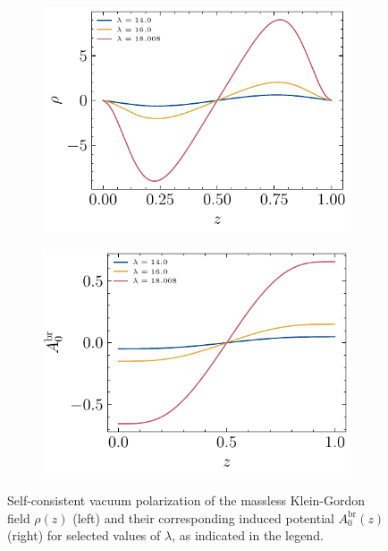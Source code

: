 \begin{figure} \begin{subfigure}{0.5\textwidth} \centering
\includegraphics[width=1\linewidth]{figures/dirichlet/vacuumPolarizationEvolution.pdf}
\label{fig:HadamardVacuumPolarization1}
\end{subfigure}
\hfill
\begin{subfigure}{0.5\textwidth} 
\centering
\includegraphics[width=1\linewidth]{figures/dirichlet/A0InducedEvolution.pdf} 
\label{fig:HadamardVacuumPolarization2} 
\end{subfigure}
\caption{Self-consistent vacuum polarization of the massless Klein-Gordon field $\rho(z)$ (left) and their corresponding induced potential $A_0^\text{br}(z)$ (right) for selected values of $\lambda$, as indicated in the legend. } \label{fig:HadamardVacuumPolarization} \end{figure}

